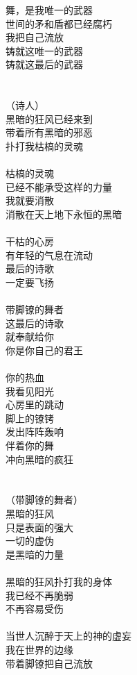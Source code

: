 舞，是我唯一的武器\\
世间的矛和盾都已经腐朽\\
我把自己流放\\
铸就这唯一的武器\\
铸就这最后的武器\\
\\
\\
（诗人）\\
黑暗的狂风已经来到\\
带着所有黑暗的邪恶\\
扑打我枯槁的灵魂\\
\\
枯槁的灵魂\\
已经不能承受这样的力量\\
我就要消散\\
消散在天上地下永恒的黑暗\\
\\
干枯的心房\\
有年轻的气息在流动\\
最后的诗歌\\
一定要飞扬\\
\\
带脚镣的舞者\\
这最后的诗歌\\
就奉献给你\\
你是你自己的君王\\
\\
你的热血\\
我看见阳光\\
心房里的跳动\\
脚上的镣铐\\
发出阵阵轰响\\
伴着你的舞\\
冲向黑暗的疯狂\\
\\
\\
（带脚镣的舞者）\\
黑暗的狂风\\
只是表面的强大\\
一切的虚伪\\
是黑暗的力量\\
\\
黑暗的狂风扑打我的身体\\
我已经不再脆弱\\
不再容易受伤\\
\\
当世人沉醉于天上的神的虚妄\\
我在世界的边缘\\
带着脚镣把自己流放\\
